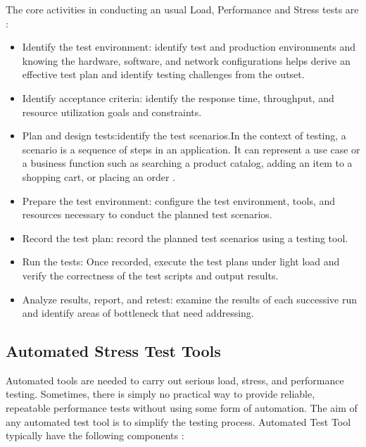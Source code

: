\documentclass[times]{stvrauth}
\begin{document}
The core activities in conducting an usual Load, Performance and Stress tests are \cite{Erinle2013}: 

\begin{itemize}
\item Identify the test environment: identify test and production environments and knowing the hardware, software, and network configurations helps derive an effective test plan and identify testing challenges from the outset.

\item Identify acceptance criteria: identify the response time, throughput, and resource utilization goals and constraints.

\item Plan and design tests:identify the test scenarios.In the context of testing, a scenario is a sequence of steps in an application. It can represent a use case or a business function such as searching a product catalog, adding an item to a shopping cart, or placing an order \cite{Corporation2007}.

\item Prepare the test environment: configure the test environment, tools, and resources necessary to conduct the planned test scenarios.

\item Record the test plan: record the planned test scenarios using a testing tool.

\item Run the tests: Once recorded, execute the test plans under light load and verify the correctness of the test scripts and output results.

\item Analyze results, report, and retest: examine the results of each successive run and identify areas of bottleneck that need addressing.  

\end{itemize}



\subsection{Automated Stress Test Tools}

Automated tools are needed to carry out serious load, stress, and performance testing. Sometimes, there is simply no practical way to provide reliable, repeatable performance tests without using some form of automation. The aim of any automated test tool is to simplify the testing process. Automated Test Tool  typically have the following components \cite{Molyneaux2009}:
\end{document}
